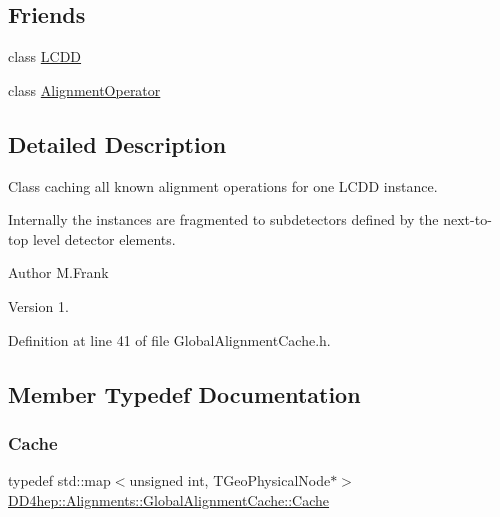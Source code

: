 \subsection*{Friends}
\begin{DoxyCompactItemize}
\item 
class \hyperlink{class_d_d4hep_1_1_alignments_1_1_global_alignment_cache_a7e41b5a9f3843a7e39b0a2f9d618ae4a}{L\+C\+DD}
\item 
class \hyperlink{class_d_d4hep_1_1_alignments_1_1_global_alignment_cache_a0123c592b59946302df6795784a503e4}{Alignment\+Operator}
\end{DoxyCompactItemize}


\subsection{Detailed Description}
Class caching all known alignment operations for one L\+C\+DD instance. 

Internally the instances are fragmented to subdetectors defined by the next-\/to-\/top level detector elements.

\begin{DoxyAuthor}{Author}
M.\+Frank 
\end{DoxyAuthor}
\begin{DoxyVersion}{Version}
1. 
\end{DoxyVersion}


Definition at line 41 of file Global\+Alignment\+Cache.\+h.



\subsection{Member Typedef Documentation}
\hypertarget{class_d_d4hep_1_1_alignments_1_1_global_alignment_cache_a51cc6e8b7d9d85cfc296e8db7f360604}{}\label{class_d_d4hep_1_1_alignments_1_1_global_alignment_cache_a51cc6e8b7d9d85cfc296e8db7f360604} 
\subsubsection{\texorpdfstring{Cache}{Cache}}
{\footnotesize\ttfamily typedef std\+::map$<$unsigned int, T\+Geo\+Physical\+Node$\ast$$>$ \hyperlink{class_d_d4hep_1_1_alignments_1_1_global_alignment_cache_a51cc6e8b7d9d85cfc296e8db7f360604}{D\+D4hep\+::\+Alignments\+::\+Global\+Alignment\+Cache\+::\+Cache}}



